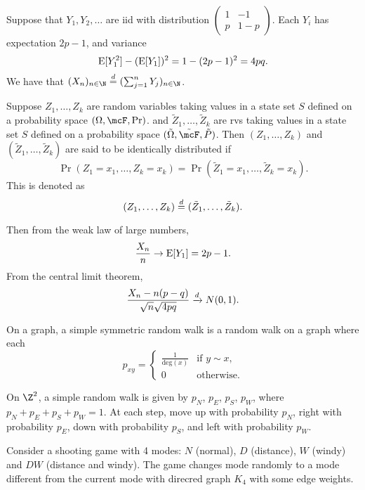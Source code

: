 \begin{examples}
    Suppose that $Y_1, Y_2, \dots$ are iid with distribution
    $\begin{pmatrix}
        1 & -1 \\
        p & 1-p
    \end{pmatrix}$.
    Each $Y_i$ has expectation $2p - 1$, and variance \[
        \operatorname{\mathrm{E}}[Y_1^2] - (\operatorname{\mathrm{E}}[Y_1])^2 = 1 - (2p - 1)^2 = 4pq.
    \]
    We have that $(X_n)_{n \in \N} \eqd (\sum_{j=1}^{n} Y_j)_{n \in \N}$.
    \begin{definition}
        Suppose $Z_1, \dots, Z_k$ are random variables taking values in a
        state set $S$ defined on a probability space $(\Omega, \mcF, \Pr)$.
        and $\tilde{Z}_1, \dots, \tilde{Z}_k$ are rvs taking values in a
        state set $S$ defined on a probability space
        $(\tilde{\Omega}, \tilde{\mcF}, \tilde{P})$.
        Then $(Z_1, \dots, Z_k)$ and $(\tilde{Z}_1, \dots, \tilde{Z}_k)$ are
        said to be identically distributed if \[
            \Pr(Z_1 = x_1, \dots, Z_k = x_k)
                = \Pr(\tilde{Z}_1 = x_1, \dots, \tilde{Z}_k = x_k).
        \] This is denoted as \[
            (Z_1, \dots, Z_k) \overset{d}{=} (\tilde{Z}_1, \dots, \tilde{Z}_k).
        \]
    \end{definition}
    Then from the weak law of large numbers, \[
        \frac{X_n}{n} \to \operatorname{\mathrm{E}}[Y_1] = 2p - 1.
    \] From the central limit theorem, \[
        \frac{X_n - n(p - q)}{\sqrt{n} \sqrt{4pq}} \xrightarrow{d} N(0, 1).
    \]

    On a graph, a simple symmetric random walk is a random walk on a graph
    where each \[
        p_{xy} = \begin{cases}
            \frac1{\mathrm{deg}(x)} & \text{if } y \sim x, \\
            0 & \text{otherwise}.
        \end{cases}
    \]

    On $\Z^2$, a simple random walk is given by $p_N$, $p_E$, $p_S$, $p_W$,
    where $p_N + p_E + p_S + p_W = 1$.
    At each step, move up with probability $p_N$, right with probability $p_E$,
    down with probability $p_S$, and left with probability $p_W$.

    \item Consider a shooting game with 4 modes: $N$ (normal), $D$ (distance),
    $W$ (windy) and $DW$ (distance and windy).
    The game changes mode randomly to a mode different from the current mode
    with direcred graph $K_4$ with some edge weights.
\end{examples}

